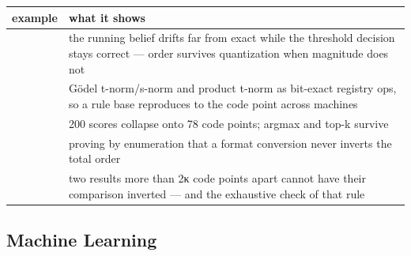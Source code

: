\begin{table}[h]
\centering
\begin{tabulary}{\linewidth}{L L}
\toprule
example & what it shows \\
\toprule
{} & the running belief drifts far from exact while the threshold decision stays correct — order survives quantization when magnitude does not \\
 & Gödel t-norm/s-norm and product t-norm as bit-exact registry ops, so a rule base reproduces to the code point across machines \\
 & 200 scores collapse onto 78 code points; argmax and top-k survive \\
 & proving by enumeration that a format conversion never inverts the total order \\
 & two results more than 2κ code points apart cannot have their comparison inverted — and the exhaustive check of that rule \\
\bottomrule
\end{tabulary}

\end{table}



\subsection{Machine Learning}



\label{11381515430689351323}{}



